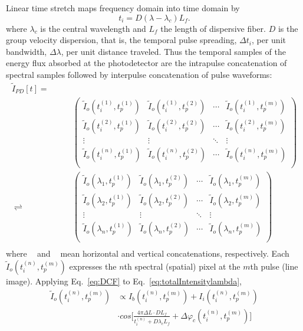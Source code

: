\documentclass[aps,pra,reprint,superscriptaddress]{revtex4-1}
\DeclareMathOperator{\vercat}{cat_\downarrow} %
\DeclareMathOperator{\horcat}{cat_\rightarrow} %
\begin{document}
Linear time stretch maps frequency domain into time domain by
\begin{equation} \label{eq:DCF}
t_i = D (\lambda - \lambda_c) L_f.
\end{equation}
where $\lambda_c$ is the central wavelength and $L_f$ the length of dispersive fiber. $D$ is the group velocity dispersion, that is, the temporal pulse spreading, $\Delta t_i$, per unit bandwidth, $\Delta\lambda$, per unit distance traveled. Thus the temporal samples of the energy flux absorbed at the photodetector are the intrapulse concatenation of spectral samples followed by interpulse concatenation of pulse waveforms:
\begin{equation}
\begin{split}
\tilde{I}_{PD}[t] = \quad\quad&\quad\\
\horcat\vercat &
\begin{pmatrix}
\tilde{I}_{o}(t_i^{(1)}, t_p^{(1)})&	\tilde{I}_{o}(t_i^{(1)}, t_p^{(2)})&	\cdots& \tilde{I}_{o}(t_i^{(1)}, t_p^{(m)})\\
\tilde{I}_{o}(t_i^{(2)}, t_p^{(1)})&	\tilde{I}_{o}(t_i^{(2)}, t_p^{(2)})&	\cdots& \tilde{I}_{o}(t_i^{(2)}, t_p^{(m)})\\
\vdots&									\vdots&									\ddots& \vdots								 \\
\tilde{I}_{o}(t_i^{(n)}, t_p^{(1)})&	\tilde{I}_{o}(t_i^{(n)}, t_p^{(2)})&	\cdots& \tilde{I}_{o}(t_i^{(n)}, t_p^{(m)})\\
\end{pmatrix} \\
\rightleftharpoons \horcat\vercat &
\begin{pmatrix}
\tilde{I}_{o}(\lambda_1, t_p^{(1)})  &\tilde{I}_{o}(\lambda_1, t_p^{(2)})   &\cdots  &\tilde{I}_{o}(\lambda_1, t_p^{(m)})\\
\tilde{I}_{o}(\lambda_2, t_p^{(1)})  &\tilde{I}_{o}(\lambda_2, t_p^{(2)})   &\cdots  &\tilde{I}_{o}(\lambda_2, t_p^{(m)})\\
\vdots						   		 &\vdots							    	&\ddots  &\vdots					 \\
\tilde{I}_{o}(\lambda_n, t_p^{(1)})  &\tilde{I}_{o}(\lambda_n, t_p^{(2)})   &\cdots  &\tilde{I}_{o}(\lambda_n, t_p^{(m)})\\
\end{pmatrix} \\
\end{split}
\end{equation}
where $\horcat$ and $\vercat$ mean horizontal and vertical concatenations, respectively. Each $\tilde{I}_{o}(t_i^{(n)}, t_p^{(m)})$ expresses the $n$th spectral (spatial) pixel at the $m$th pulse (line image). Applying Eq.~\ref{eq:DCF} to Eq.~\ref{eq:totalIntensitylambda},
\begin{equation}\label{eq:afterDCF}
\begin{split}
\tilde{I}_{o}(t_i^{(n)}, t_p^{(m)}) & \propto I_b (t_i^{(n)}, t_p^{(m)}) + I_i (t_i^{(n)}, t_p^{(m)}) \\
& \cdot cos\Bigg[ \frac{4\pi\Delta L \cdot D L_f}{t_i^{(n)} + D\lambda_c L_f} + \Delta \varphi_c(t_i^{(n)}, t_p^{(m)}) \Bigg]
\end{split}
\end{equation}
\end{document}
